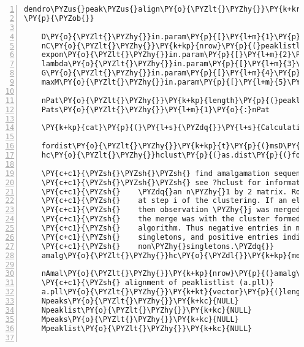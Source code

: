 \begin{Verbatim}[commandchars=\\\{\},codes={\catcode`\$=3\catcode`\^=7\catcode`\_=8},gobble=0,numbers=left,fontfamily=fvm,fontshape=n,fontsize=\footnotesize,tabsize=2]
dendro\PYZus{}peak\PYZus{}align\PY{o}{\PYZlt{}\PYZhy{}}\PY{k+kr}{function}\PY{p}{(}msD\PY{p}{,}peaklistlist\PY{p}{,}in.param\PY{p}{)}
\PY{p}{\PYZob{}}

	D\PY{o}{\PYZlt{}\PYZhy{}}in.param\PY{p}{[}\PY{l+m}{1}\PY{p}{]}
	nC\PY{o}{\PYZlt{}\PYZhy{}}\PY{k+kp}{nrow}\PY{p}{(}peaklistlist\PY{p}{[[}\PY{l+m}{1}\PY{p}{]]}\PY{p}{)}\PY{l+m}{\PYZhy{}1}
	expon\PY{o}{\PYZlt{}\PYZhy{}}in.param\PY{p}{[}\PY{l+m}{2}\PY{p}{]}
	lambda\PY{o}{\PYZlt{}\PYZhy{}}in.param\PY{p}{[}\PY{l+m}{3}\PY{p}{]}
	G\PY{o}{\PYZlt{}\PYZhy{}}in.param\PY{p}{[}\PY{l+m}{4}\PY{p}{]}
	maxM\PY{o}{\PYZlt{}\PYZhy{}}in.param\PY{p}{[}\PY{l+m}{5}\PY{p}{]}
	
	nPat\PY{o}{\PYZlt{}\PYZhy{}}\PY{k+kp}{length}\PY{p}{(}peaklistlist\PY{p}{)}
	Pats\PY{o}{\PYZlt{}\PYZhy{}}\PY{l+m}{1}\PY{o}{:}nPat
	
	\PY{k+kp}{cat}\PY{p}{(}\PY{l+s}{\PYZdq{}}\PY{l+s}{Calculating merge sequence for spectra \PYZbs{}n\PYZdq{}}\PY{p}{)}
		
	fordist\PY{o}{\PYZlt{}\PYZhy{}}\PY{k+kp}{t}\PY{p}{(}msD\PY{o}{\PYZdl{}}intensity\PY{p}{)}
	hc\PY{o}{\PYZlt{}\PYZhy{}}hclust\PY{p}{(}as.dist\PY{p}{(}fordist\PY{p}{,}diag\PY{o}{=}\PY{k+kc}{FALSE}\PY{p}{,}upper\PY{o}{=}\PY{k+kc}{FALSE}\PY{p}{)}\PY{p}{,}\PY{l+s}{\PYZdq{}}\PY{l+s}{average\PYZdq{}}\PY{p}{)}
	
	\PY{c+c1}{\PYZsh{}\PYZsh{}\PYZsh{} find amalgamation sequence}
	\PY{c+c1}{\PYZsh{}\PYZsh{}\PYZsh{} see ?hclust for information on the merge matrix:}
	\PY{c+c1}{\PYZsh{}    \PYZdq{}an n\PYZhy{}1 by 2 matrix. Row i of merge describes the merging of clusters }
	\PY{c+c1}{\PYZsh{}    at step i of the clustering. If an element j in the row is negative, }
	\PY{c+c1}{\PYZsh{}    then observation \PYZhy{}j was merged at this stage. If j is positive then }
	\PY{c+c1}{\PYZsh{}    the merge was with the cluster formed at the (earlier) stage j of the }
	\PY{c+c1}{\PYZsh{}    algorithm. Thus negative entries in merge indicate agglomerations of }
	\PY{c+c1}{\PYZsh{}    singletons, and positive entries indicate agglomerations of }
	\PY{c+c1}{\PYZsh{}    non\PYZhy{}singletons.\PYZdq{}}
	amalg\PY{o}{\PYZlt{}\PYZhy{}}hc\PY{o}{\PYZdl{}}\PY{k+kp}{merge}

	nAmal\PY{o}{\PYZlt{}\PYZhy{}}\PY{k+kp}{nrow}\PY{p}{(}amalg\PY{p}{)}
	\PY{c+c1}{\PYZsh{} alignment of peaklistlist (a.pll)}
	a.pll\PY{o}{\PYZlt{}\PYZhy{}}\PY{k+kt}{vector}\PY{p}{(}length\PY{o}{=}nAmal\PY{p}{,}mode\PY{o}{=}\PY{l+s}{\PYZdq{}}\PY{l+s}{list\PYZdq{}}\PY{p}{)}
	Npeaks\PY{o}{\PYZlt{}\PYZhy{}}\PY{k+kc}{NULL}
	Npeaklist\PY{o}{\PYZlt{}\PYZhy{}}\PY{k+kc}{NULL}
	Mpeaks\PY{o}{\PYZlt{}\PYZhy{}}\PY{k+kc}{NULL}
	Mpeaklist\PY{o}{\PYZlt{}\PYZhy{}}\PY{k+kc}{NULL}
	

\end{Verbatim}
